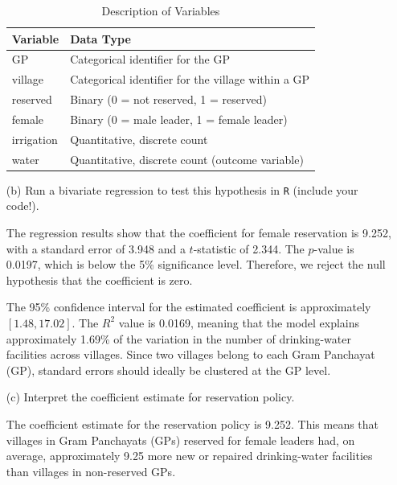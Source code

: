 \documentclass[12pt,letterpaper]{article}
\begin{document}
\begin{enumerate}
	\begin{table}[htbp]
		\centering
		\caption{Description of Variables}
		\label{tab:variables}
		\begin{tabular}{l | p{9cm}}
			\hline
			\textbf{Variable} & \textbf{Data Type} \\
			\hline
			GP & Categorical identifier for the GP \\
			village & Categorical identifier for the village within a GP \\
			reserved & Binary (0 = not reserved, 1 = reserved) \\
			female & Binary (0 = male leader, 1 = female leader) \\
			irrigation & Quantitative, discrete count \\
			water & Quantitative, discrete count (outcome variable) \\
			\hline
		\end{tabular}
	\end{table}
	\vspace{6cm}
	\item [(b)] Run a bivariate regression to test this hypothesis in \texttt{R} (include your code!).
	
	
The regression results show that the coefficient for female reservation is 
9.252, with a standard error of 3.948 and a \(t\)-statistic of 2.344. 
The \(p\)-value is 0.0197, which is below the 5\% significance level. 
Therefore, we reject the null hypothesis that the coefficient is zero.
	\vspace{0.1cm}
	
The 95\% confidence interval for the estimated coefficient is approximately 
\([1.48, 17.02]\). The \(R^2\) value is 0.0169, meaning that the model 
explains approximately 1.69\% of the variation in the number of 
drinking-water facilities across villages. Since two villages belong to each Gram Panchayat (GP), standard errors 
should ideally be clustered at the GP level.
	\vspace{1cm}
	\item [(c)] Interpret the coefficient estimate for reservation policy. 
	
	The coefficient estimate for the reservation policy is 9.252. This means that villages in Gram Panchayats (GPs) reserved for female leaders had, on average, approximately 9.25 more new or repaired drinking-water facilities than villages in non-reserved GPs.
	

\end{enumerate}
\end{document}
